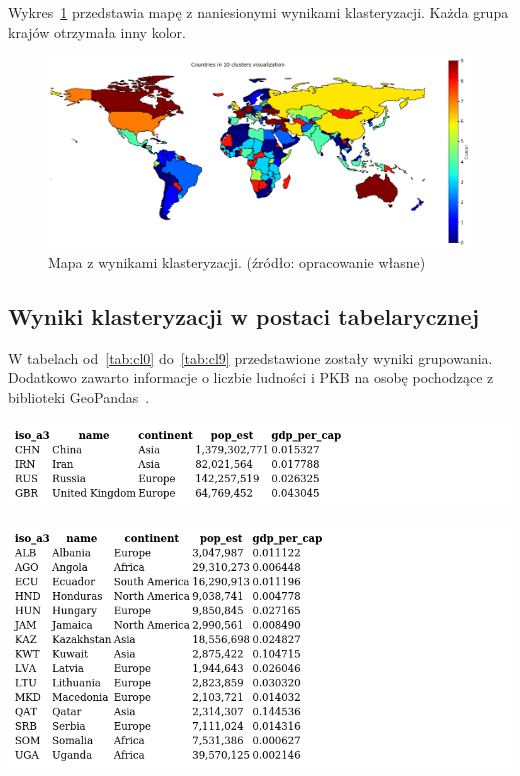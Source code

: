 \documentclass[11pt]{report}
\begin{document}
    Wykres~\ref{fig:clust10} przedstawia mapę z naniesionymi wynikami klasteryzacji. Każda grupa krajów otrzymała inny kolor.

    \begin{figure}[!htp]
        \centering
        \includegraphics[width=\linewidth]{fig/CLUST/10clusterMap.png}
        \caption{Mapa z wynikami klasteryzacji. (źródło: opracowanie własne)}
        \label{fig:clust10}
    \end{figure}

    \subsection{Wyniki klasteryzacji w postaci tabelarycznej}
    W tabelach od~\ref{tab:cl0} do~\ref{tab:cl9} przedstawione zostały wyniki grupowania.
    Dodatkowo zawarto informacje o liczbie ludności i PKB na osobę pochodzące z biblioteki GeoPandas~\cite{geopandas}.

    \begin{table}[!htp]
        \centering
        \includegraphics[width=\linewidth]{tables/CLUST/clust0kmeans.png}
        \caption{Klaster 0. (źródło: opracowanie własne)}
        \label{tab:cl0}
    \end{table}

    \begin{table}[!htp]
        \centering
        \includegraphics[width=\linewidth]{tables/CLUST/clust1kmeans.png}
        \caption{Klaster 1. (źródło: opracowanie własne)}
        \label{tab:cl1}
    \end{table}
\end{document}
